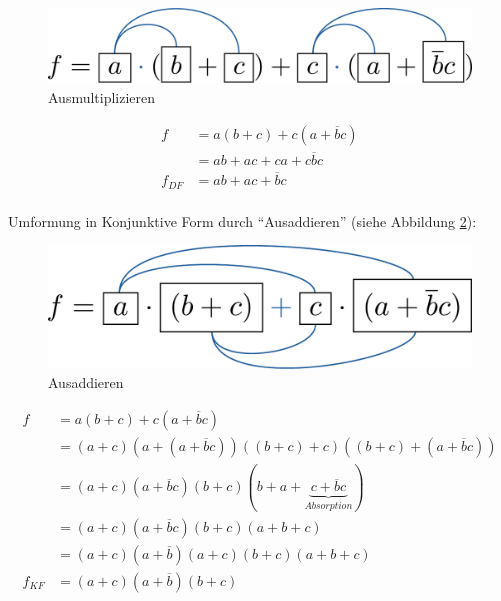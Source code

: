 \documentclass[11pt,a4paper]{scrreprt}
\begin{document}
\begin{figure}[htbp] %
	\centering
	\includegraphics[scale=0.4]{Ausmultiplizieren.pdf}
	\caption{Ausmultiplizieren}
	\label{Ausmultiplizieren}
\end{figure}
\begin{align*}
				  f &= a(b + c) + c(a + \overline{b}c) \\
					&= ab + ac + ca + c\overline{b}c   \\
	f_{\textit{DF}} &= ab + ac + \overline{b}c    \\
\end{align*}

Umformung in Konjunktive Form durch "`Ausaddieren"' (siehe Abbildung \ref{Ausaddieren}):

\begin{figure}[htbp] %
	\centering
	\includegraphics[scale=0.4]{Ausaddieren.pdf}
	\caption{Ausaddieren}
	\label{Ausaddieren}
\end{figure}

\begin{align*}
				  f &= a(b + c) + c(a + \overline{b}c)                \\
					&= (a + c) (a + (a + \overline{b}c))
						((b + c) + c) ((b + c) + (a + \overline{b}c)) \\
	                &= (a + c) (a + \overline{b}c)
					   (b + c) (b + a 
					   + \underbrace{c + \overline{b}c}_{Absorption}) \\
	                &= (a + c) (a + \overline{b}c) (b + c) (a + b + c) \\
	                &= (a + c) (a + \overline{b}) (a + c) 
	                   (b + c) (a + b + c) \\
	f_{\textit{KF}} &= (a + c) (a + \overline{b}) (b + c) \\
\end{align*}
\end{document}
